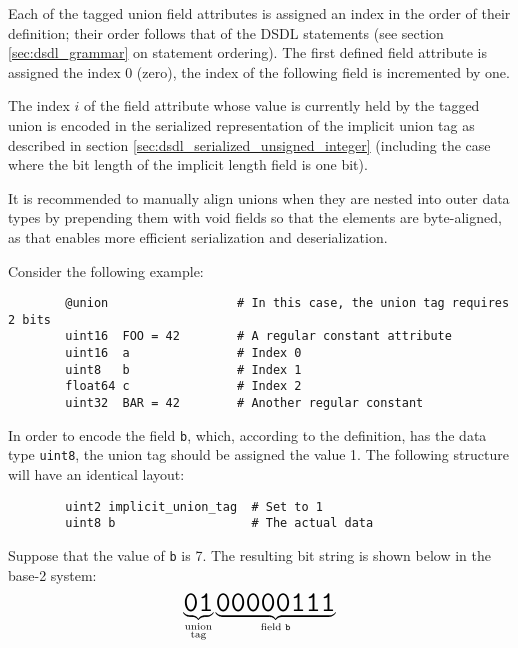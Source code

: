 Each of the tagged union field attributes is assigned an index in the order of their definition;
their order follows that of the DSDL statements (see section \ref{sec:dsdl_grammar} on statement ordering).
The first defined field attribute is assigned the index 0 (zero),
the index of the following field is incremented by one.

The index $i$ of the field attribute whose value is currently held by the tagged union is encoded
in the serialized representation of the implicit union tag as described in section
\ref{sec:dsdl_serialized_unsigned_integer}
(including the case where the bit length of the implicit length field is one bit).

\begin{remark}
    It is recommended to manually align unions when they are nested into outer data types by
    prepending them with void fields so that the elements are byte-aligned,
    as that enables more efficient serialization and deserialization.

    Consider the following example:

    \begin{verbatim}
        @union                  # In this case, the union tag requires 2 bits
        uint16  FOO = 42        # A regular constant attribute
        uint16  a               # Index 0
        uint8   b               # Index 1
        float64 c               # Index 2
        uint32  BAR = 42        # Another regular constant
    \end{verbatim}

    In order to encode the field \verb|b|, which, according to the definition,
    has the data type \verb|uint8|, the union tag should be assigned the value 1.
    The following structure will have an identical layout:

    \begin{verbatim}
        uint2 implicit_union_tag  # Set to 1
        uint8 b                   # The actual data
    \end{verbatim}

    Suppose that the value of \verb|b| is 7. The resulting bit string is shown below in the base-2 system:
    $$%
    \underbrace{\hugett{01}}_{\substack{\text{union} \\ \text{tag}}}%
    \underbrace{\hugett{00000111}}_{\text{field }\texttt{b}}%
    $$
\end{remark}

